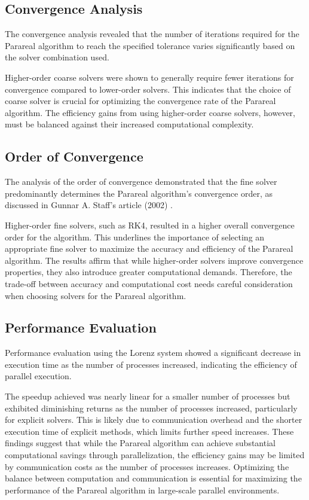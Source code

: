 \documentclass[a4paper,12pt,french]{article}
\begin{document}
\subsection{Convergence Analysis}
The convergence analysis revealed that the number of iterations required for the Parareal algorithm to reach the specified tolerance varies significantly based on the solver combination used. 

Higher-order coarse solvers were shown to generally require fewer iterations for convergence compared to lower-order solvers. This indicates that the choice of coarse solver is crucial for optimizing the convergence rate of the Parareal algorithm. The efficiency gains from using higher-order coarse solvers, however, must be balanced against their increased computational complexity.
\subsection{Order of Convergence}
The analysis of the order of convergence demonstrated that the fine solver predominantly determines the Parareal algorithm’s convergence order, as discussed in Gunnar A. Staff's article (2002) \cite{staff2003convergence}. 

Higher-order fine solvers, such as RK4, resulted in a higher overall convergence order for the algorithm. This underlines the importance of selecting an appropriate fine solver to maximize the accuracy and efficiency of the Parareal algorithm. The results affirm that while higher-order solvers improve convergence properties, they also introduce greater computational demands. Therefore, the trade-off between accuracy and computational cost needs careful consideration when choosing solvers for the Parareal algorithm.

\newpage
\subsection{Performance Evaluation}
Performance evaluation using the Lorenz system showed a significant decrease in execution time as the number of processes increased, indicating the efficiency of parallel execution.

The speedup achieved was nearly linear for a smaller number of processes but exhibited diminishing returns as the number of processes increased, particularly for explicit solvers. This is likely due to communication overhead and the shorter execution time of explicit methods, which limits further speed increases. These findings suggest that while the Parareal algorithm can achieve substantial computational savings through parallelization, the efficiency gains may be limited by communication costs as the number of processes increases. Optimizing the balance between computation and communication is essential for maximizing the performance of the Parareal algorithm in large-scale parallel environments.
\newpage
\end{document}
